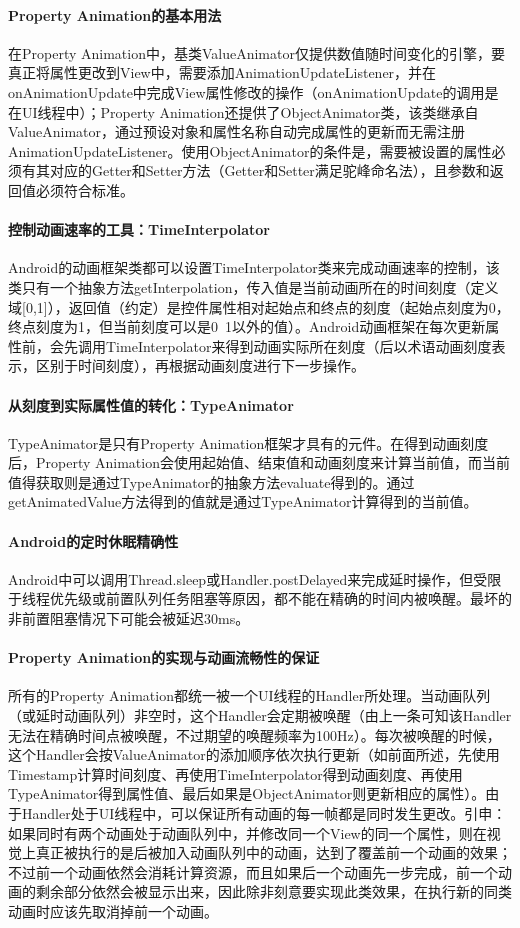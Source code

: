 \documentclass[UTF8]{ctexart}
\begin{document}
    \paragraph{Property Animation的基本用法}
    在Property Animation中，基类ValueAnimator仅提供数值随时间变化的引擎，要真正将属性更改到View中，需要添加AnimationUpdateListener，并在onAnimationUpdate中完成View属性修改的操作（onAnimationUpdate的调用是在UI线程中）；Property Animation还提供了ObjectAnimator类，该类继承自ValueAnimator，通过预设对象和属性名称自动完成属性的更新而无需注册AnimationUpdateListener。使用ObjectAnimator的条件是，需要被设置的属性必须有其对应的Getter和Setter方法（Getter和Setter满足驼峰命名法），且参数和返回值必须符合标准。
    \paragraph{控制动画速率的工具：TimeInterpolator}
    Android的动画框架类都可以设置TimeInterpolator类来完成动画速率的控制，该类只有一个抽象方法getInterpolation，传入值是当前动画所在的时间刻度（定义域[0,1]），返回值（约定）是控件属性相对起始点和终点的刻度（起始点刻度为0，终点刻度为1，但当前刻度可以是0~1以外的值）。Android动画框架在每次更新属性前，会先调用TimeInterpolator来得到动画实际所在刻度（后以术语动画刻度表示，区别于时间刻度），再根据动画刻度进行下一步操作。
    \paragraph{从刻度到实际属性值的转化：TypeAnimator}
    TypeAnimator是只有Property Animation框架才具有的元件。在得到动画刻度后，Property Animation会使用起始值、结束值和动画刻度来计算当前值，而当前值得获取则是通过TypeAnimator的抽象方法evaluate得到的。通过getAnimatedValue方法得到的值就是通过TypeAnimator计算得到的当前值。
    \paragraph{Android的定时休眠精确性}
    Android中可以调用Thread.sleep或Handler.postDelayed来完成延时操作，但受限于线程优先级或前置队列任务阻塞等原因，都不能在精确的时间内被唤醒。最坏的非前置阻塞情况下可能会被延迟30ms。
    \paragraph{Property Animation的实现与动画流畅性的保证}
    所有的Property Animation都统一被一个UI线程的Handler所处理。当动画队列（或延时动画队列）非空时，这个Handler会定期被唤醒（由上一条可知该Handler无法在精确时间点被唤醒，不过期望的唤醒频率为100Hz）。每次被唤醒的时候，这个Handler会按ValueAnimator的添加顺序依次执行更新（如前面所述，先使用Timestamp计算时间刻度、再使用TimeInterpolator得到动画刻度、再使用TypeAnimator得到属性值、最后如果是ObjectAnimator则更新相应的属性）。由于Handler处于UI线程中，可以保证所有动画的每一帧都是同时发生更改。引申：如果同时有两个动画处于动画队列中，并修改同一个View的同一个属性，则在视觉上真正被执行的是后被加入动画队列中的动画，达到了覆盖前一个动画的效果；不过前一个动画依然会消耗计算资源，而且如果后一个动画先一步完成，前一个动画的剩余部分依然会被显示出来，因此除非刻意要实现此类效果，在执行新的同类动画时应该先取消掉前一个动画。
\end{document}
